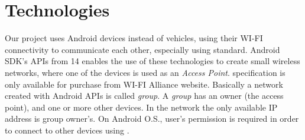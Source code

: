 \section{Technologies}

Our project uses Android devices instead of vehicles, using their WI-FI connectivity to communicate each other, especially using \direct standard. Android SDK's APIs from 14 enables the use of these technologies to create small wireless networks, where one of the devices is used as an \emph{Access Point}. \direct specification is only available for purchase from WI-FI Alliance\textsuperscript{\texttrademark} website\cite{wifi_direct}.
Basically a network created with Android \direct APIs is called \emph{group}. A \emph{group} has an owner (the access point), and one or more other devices. In the network the only available IP address is group owner's. 
On Android O.S., user's permission is required in order to connect to other devices using \direct.
